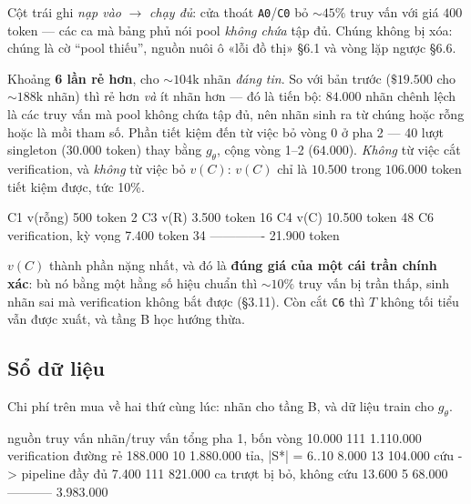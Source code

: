 \documentclass[11pt,a4paper]{article}
\begin{document}
Cột trái ghi \emph{nạp vào} $\to$ \emph{chạy đủ}: cửa thoát \texttt{A0}/\texttt{C0} bỏ
${\sim}45\%$ truy vấn với giá $400$ token --- các ca mà bảng phủ nói pool \emph{không chứa} tập
đủ. Chúng không bị xóa: chúng là cờ ``pool thiếu'', nguồn nuôi ô «lỗi đồ thị» \S6.1 và vòng lặp
ngược \S6.6.

Khoảng \textbf{6 lần rẻ hơn}, cho ${\sim}104$k nhãn \emph{đáng tin}. So với bản trước
($\$19.500$ cho ${\sim}188$k nhãn) thì rẻ hơn \emph{và} ít nhãn hơn --- đó là tiến bộ:
$84.000$ nhãn chênh lệch là các truy vấn mà pool không chứa tập đủ, nên nhãn sinh ra từ chúng
hoặc rỗng hoặc là mồi tham số. Phần tiết kiệm đến từ việc bỏ
vòng 0 ở pha 2 --- 40 lượt singleton ($30.000$ token) thay bằng $g_\theta$, cộng vòng 1--2
($64.000$). \emph{Không} từ việc cắt verification, và \emph{không} từ việc bỏ $v(C)$: $v(C)$
chỉ là $10.500$ trong $106.000$ token tiết kiệm được, tức 10\%.

\begin{dia}
C1  v(rỗng)                   500 token    2%
C3  v(R)                    3.500 token   16%
C4  v(C)                   10.500 token   48%
C6  verification, kỳ vọng   7.400 token   34%
                          -------------
                           21.900 token
\end{dia}

$v(C)$ thành phần nặng nhất, và đó là \textbf{đúng giá của một cái trần chính xác}: bù nó bằng
một hằng số hiệu chuẩn thì ${\sim}10\%$ truy vấn bị trần thấp, sinh nhãn sai mà verification
không bắt được (\S3.11). Còn cắt \texttt{C6} thì $T$ không tối tiểu vẫn được xuất, và tầng B
học hướng thừa.

\subsection{Sổ dữ liệu}

Chi phí trên mua về hai thứ cùng lúc: nhãn cho tầng B, và dữ liệu train cho $g_\theta$.

\begin{dia}
nguồn                              truy vấn   nhãn/truy vấn    tổng
pha 1, bốn vòng                     10.000        111        1.110.000
verification đường rẻ              188.000         10        1.880.000
tỉa, |S*| = 6..10                    8.000         13          104.000
cứu -> pipeline đầy đủ               7.400        111          821.000
ca trượt bị bỏ, không cứu           13.600          5           68.000
                                                            -----------
                                                              3.983.000
\end{dia}
\end{document}
